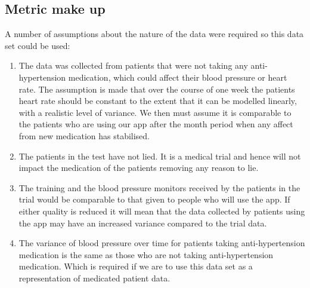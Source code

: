 \documentclass[11pt]{article}
\begin{document}
\begin{center}
\end{center}

\subsection{Metric make up} 
 A number of assumptions about the nature of the data were required so this data set could be used: 
\begin{enumerate}
\item 
The data was collected from patients that were not taking any anti-hypertension medication, which could affect their blood pressure or heart rate. The assumption is made that over the course of one week the patients heart rate should be constant to the extent that it can be modelled linearly, with a realistic level of variance. We then must assume it is comparable to the patients who are using our app after the month period when any affect from new medication has stabilised. 
\item 
The patients in the test have not lied. It is a medical trial and hence will not impact the medication of the patients removing any reason to lie.
\item 
The training and the blood pressure monitors received by the patients in the trial would be comparable to that given to people who will use the app. If either quality is reduced it will mean that the data collected by patients using the app may have an increased variance compared to the trial data.
\item
The variance of blood pressure over time for patients taking anti-hypertension medication is the same as those who are not taking anti-hypertension medication. Which is required if we are to use this data set as a representation of medicated patient data.
\end{enumerate}
\end{document}

